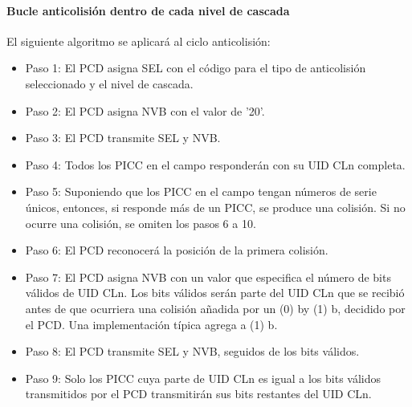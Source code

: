 \paragraph{Bucle anticolisión dentro de cada nivel de cascada}
El siguiente algoritmo se aplicará al ciclo anticolisión:\par

\begin{itemize}
	\item Paso 1: El PCD asigna SEL con el código para el tipo de anticolisión seleccionado y el nivel de cascada.\par

	\item Paso 2: El PCD asigna NVB con el valor de '20'.\par

	\item Paso 3: El PCD transmite SEL y NVB.\par

	\item Paso 4: Todos los PICC en el campo responderán con su UID CLn completa.\par

	\item Paso 5: Suponiendo que los PICC en el campo tengan números de serie únicos, entonces, si responde más de un PICC, se produce una colisión. Si no ocurre una colisión, se omiten los pasos 6 a 10.\par

	\item Paso 6: El PCD reconocerá la posición de la primera colisión.\par

	\item Paso 7: El PCD asigna NVB con un valor que especifica el número de bits válidos de UID CLn. Los bits válidos serán parte del UID CLn que se recibió antes de que ocurriera una colisión añadida por un (0) by (1) b, decidido por el PCD. Una implementación típica agrega a (1) b.\par

	\item Paso 8: El PCD transmite SEL y NVB, seguidos de los bits válidos.\par

	\item Paso 9: Solo los PICC cuya parte de UID CLn es igual a los bits válidos transmitidos por el PCD transmitirán sus bits restantes del UID CLn.\par


\end{itemize}
